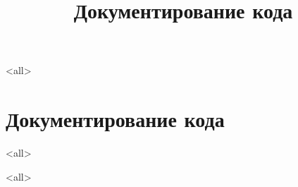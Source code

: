
\mode<all>{}

\title[Toolchain]{Документирование кода}


\begin{frame}
	\frametitle{}
	\titlepage
	\vspace{-0.5cm}
	\begin{center}
	\end{center}
\end{frame}

\begin{frame}
	\tableofcontents
\end{frame}




\section{Документирование кода}

\mode<all>{}

\mode<all>

